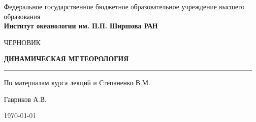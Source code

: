 \thispagestyle{empty}
\begin{center}
	\scriptsize
 Федеральное государственное бюджетное образовательное учреждение высшего образования\\
	\vspace{0.5ex}
 \large
	\textbf{Институт океанологии им. П.П. Ширшова РАН}
\end{center}

\vspace{5ex}
\begin{center}
	\vspace{10ex}

	\begin{large}
    	ЧЕРНОВИК
	\end{large}

	\vspace{7ex}

	\begin{huge}
		\textbf{ДИНАМИЧЕСКАЯ МЕТЕОРОЛОГИЯ} \\
	\end{huge} 
 
 	\noindent\rule{15cm}{0.4pt}
	
    \begin{large}
    	По материалам курса лекций  и Степаненко В.М.
	\end{large}

    \begin{flushright}
        Гавриков А.В.
    \end{flushright}

	\vspace{5ex}
	

	\vfill \today %
\end{center}
